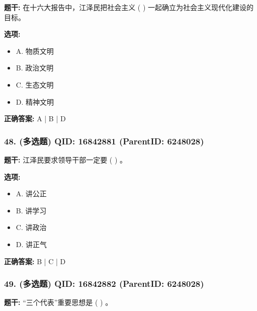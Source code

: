 \documentclass[12pt,UTF8]{ctexart}
\begin{document}
\textbf{题干:}
在十六大报告中，江泽民把社会主义 ( ) 一起确立为社会主义现代化建设的目标。



\textbf{选项:}
\begin{itemize}[leftmargin=*]

  \item A. 物质文明

  \item B. 政治文明

  \item C. 生态文明

  \item D. 精神文明

\end{itemize}

\textbf{正确答案:}
A | B | D

\vspace{0.3em}\hrulefill\vspace{0.7em}

\subsubsection*{48. (多选题) \small QID: 16842881 (ParentID: 6248028)}

\textbf{题干:}
江泽民要求领导干部一定要 ( ) 。



\textbf{选项:}
\begin{itemize}[leftmargin=*]

  \item A. 讲公正

  \item B. 讲学习

  \item C. 讲政治

  \item D. 讲正气

\end{itemize}

\textbf{正确答案:}
B | C | D

\vspace{0.3em}\hrulefill\vspace{0.7em}

\subsubsection*{49. (多选题) \small QID: 16842882 (ParentID: 6248028)}

\textbf{题干:}
“三个代表”重要思想是 ( ) 。
\end{document}
